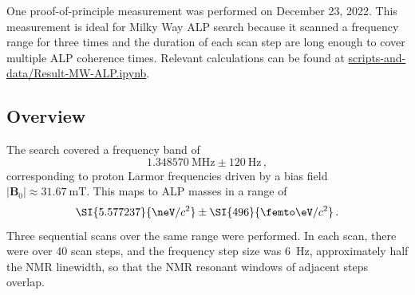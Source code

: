 One proof-of-principle measurement was performed on December 23, 2022. This measurement is ideal for Milky Way ALP search because it scanned a frequency range for three times and the duration of each scan step are long enough to cover multiple ALP coherence times. 
Relevant calculations can be found at \url{scripts-and-data/Result-MW-ALP.ipynb}.

\subsection{Overview}\label{sec:results:MWALP20221223:experiment}

The search covered a frequency band of 
\begin{equation}
    \SI{1.348570}{\MHz}\pm\SI{120}{\Hz}\,,\nonumber
\end{equation}
corresponding to proton Larmor frequencies driven by a bias field $|\mathbf{B}_0| \approx \SI{31.67}{\milli\tesla}$.
This maps to ALP masses in a range of
\begin{equation}
    \SI{5.577237}{\neV/c^2}\pm\SI{496}{\femto\eV/c^2}\,.\nonumber
\end{equation}
Three sequential scans over the same range were performed. 
In each scan, there were over 40 scan steps, and the frequency step size was \SI{6}{\Hz}, approximately half the NMR linewidth, so that the NMR resonant windows of adjacent steps overlap. 

